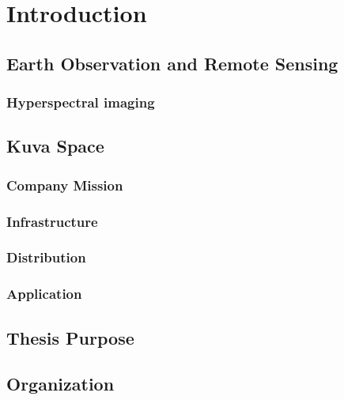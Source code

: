 \chapter{Introduction}


\section{Earth Observation and Remote Sensing}

\subsection{Hyperspectral imaging}

\section{Kuva Space}

\subsection{Company Mission}
\subsection{Infrastructure}
\subsection{Distribution}
\subsection{Application}

\section{Thesis Purpose}

\section{Organization}
